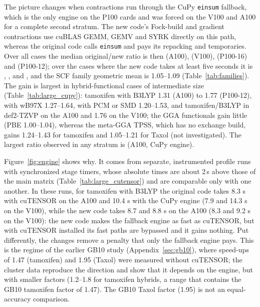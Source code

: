 The picture changes when contractions run through the CuPy \texttt{einsum} fallback, which is the only engine on the P100 cards and was forced on the V100 and A100 for a complete second stratum. The new code's Fock-build and gradient contractions use cuBLAS GEMM, GEMV and SYRK directly on this path, whereas the original code calls \texttt{einsum} and pays its repacking and temporaries. Over all cases the median original/new ratio is then \MedianAllAHundCupy{} (A100), \MedianAllVHundCupy{} (V100), \MedianAllPSixteen{} (P100-16) and \MedianAllPTwelve{} (P100-12); over the cases where the new code takes at least five seconds it is \MedianBigAHundCupy{}, \MedianBigVHundCupy{}, \MedianBigPSixteen{} and \MedianBigPTwelve{}, and the SCF family geometric mean is 1.05--1.09 (Table~\ref{tab:families}). The gain is largest in hybrid-functional cases of intermediate size (Table~\ref{tab:large_cupy}): tamoxifen with B3LYP 1.31 (A100) to 1.77 (P100-12), with wB97X 1.27--1.64, with PCM or SMD 1.20--1.53, and tamoxifen/B3LYP in def2-TZVP \MaxAllAHundCupy{} on the A100 and 1.76 on the V100; the GGA functionals gain little (PBE 1.00--1.04), whereas the meta-GGA TPSS, which has no exchange build, gains 1.24--1.43 for tamoxifen and 1.05--1.21 for Taxol (not investigated). The largest ratio observed in any stratum is \MaxAllAHundCupy{} (A100, CuPy engine).



Figure~\ref{fig:engine} shows why. It comes from separate, instrumented profile runs with synchronized stage timers, whose absolute times are about 2\,s above those of the main matrix (Table~\ref{tab:large_cutensor}) and are comparable only with one another. In these runs, for tamoxifen with B3LYP the original code takes 8.3 s with cuTENSOR on the A100 and 10.4 s with the CuPy engine (7.9 and 14.3 s on the V100), while the new code takes 8.7 and 8.8 s on the A100 (8.3 and 9.2 s on the V100): the new code makes the fallback engine as fast as cuTENSOR, but with cuTENSOR installed its fast paths are bypassed and it gains nothing. Put differently, the changes remove a penalty that only the fallback engine pays. This is the regime of the earlier GB10 study (Appendix~\ref{sec:gb10}), where speed-ups of 1.47 (tamoxifen) and 1.95 (Taxol) were measured without cuTENSOR; the cluster data reproduce the direction and show that it depends on the engine, but with smaller factors (1.2--1.8 for tamoxifen hybrids, a range that contains the GB10 tamoxifen factor of 1.47). The GB10 Taxol factor (1.95) is not an equal-accuracy comparison.

